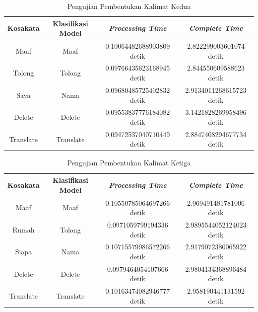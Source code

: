 \begin{longtable}{|c|c|c|c|}
  \caption{Pengujian Pembentukan Kalimat Kedua}
  \label{tb:prediksikombinasi2}                                   \\
  \hline
  \rowcolor[HTML]{C0C0C0}
  \textbf{Kosakata} & \textbf{Klasifikasi Model} & \textbf{\emph{Processing Time}} & \textbf{\emph{Complete Time}}\\
  \hline
  Maaf              & Maaf                          & 0.10064482688903809 detik                           & 2.822299003601074 detik                                 \\
  Tolong            & Tolong                        & 0.09766435623168945 detik                           & 2.844550609588623 detik                                 \\
  Saya              & Nama                          & 0.09680485725402832 detik                           & 2.9134011268615723 detik                                  \\
  Delete              & Delete                      & 0.09553837776184082 detik                           & 3.1421828269958496 detik                                  \\
  Translate              & Translate                & 0.09472537040710449 detik                           & 2.8847408294677734 detik                                  \\
  \hline
\end{longtable}

\begin{longtable}{|c|c|c|c|}
  \caption{Pengujian Pembentukan Kalimat Ketiga}
  \label{tb:prediksikombinasi3}                                   \\
  \hline
  \rowcolor[HTML]{C0C0C0}
  \textbf{Kosakata} & \textbf{Klasifikasi Model} & \textbf{\emph{Processing Time}} & \textbf{\emph{Complete Time}}\\
  \hline
  Maaf              & Maaf                          & 0.10550785064697266 detik                           & 2.969491481781006 detik                                 \\
  Rumah            & Tolong                         & 0.0971059799194336  detik                           & 2.9895544052124023 detik                                  \\
  Siapa              & Nama                         & 0.10715579986572266 detik                           & 2.9179072380065922 detik                                  \\
  Delete              & Delete                      & 0.0979464054107666  detik                           & 2.9804134368896484 detik                                  \\
  Translate              & Translate                & 0.10163474082946777 detik                           & 2.958190441131592 detik                                 \\
  \hline
\end{longtable}

